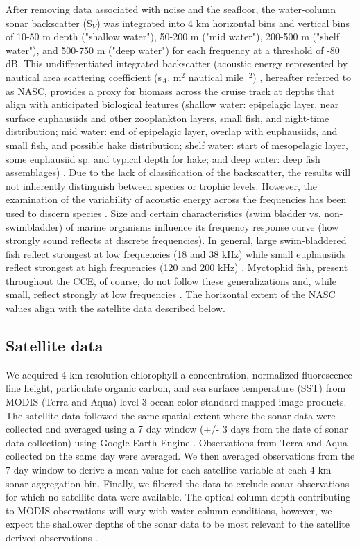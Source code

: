 \documentclass[10pt,letterpaper]{article}
\begin{document}
After removing data associated with noise and the seafloor, the water-column sonar backscatter (S$_{V}$) was integrated into 4 km horizontal bins and vertical bins of 10-50 m depth ("shallow water"), 50-200 m ("mid water"), 200-500 m ("shelf water"), and 500-750 m ("deep water") for each frequency at a threshold of -80 dB.
This undifferentiated integrated backscatter (acoustic energy represented by nautical area scattering coefficient (s$_{A}$, m$^{2}$ nautical mile$^{-2}$) \cite{maclennan2002consistent}, hereafter referred to as NASC, provides a proxy for biomass across the cruise track at depths that align with anticipated biological features (shallow water: epipelagic layer, near surface euphausiids and other zooplankton layers, small fish, and night-time distribution; mid water: end of epipelagic layer, overlap with euphausiids, and small fish, and possible hake distribution; shelf water: start of mesopelagic layer, some euphausiid sp. and typical depth for hake; and deep water: deep fish assemblages) \cite{whitehead1985clupeoid, benoit2004diel, ressler2005spatial, ressler2007pacific}.
Due to the lack of classification of the backscatter, the results will not inherently distinguish between species or trophic levels.
However, the examination of the variability of acoustic energy across the frequencies has been used to discern species \cite{de2010development, korneliussen2002operational}.
Size and certain characteristics (swim bladder vs. non-swimbladder) of marine organisms influence its frequency response curve (how strongly sound reflects at discrete frequencies).
In general, large swim-bladdered fish reflect strongest at low frequencies (18 and 38 kHz) while small euphausiids reflect strongest at high frequencies (120 and 200 kHz) \cite{trenkel2013fisheries}.
Myctophid fish, present throughout the CCE, of course, do not follow these generalizations and, while small, reflect strongly at low frequencies \cite{benoit2009effects}. The horizontal extent of the NASC values align with the satellite data described below.

\subsection*{Satellite data}

We acquired 4 km resolution chlorophyll-a concentration, normalized fluorescence line height, particulate organic carbon, and sea surface temperature (SST) from MODIS (Terra and Aqua) level-3 ocean color standard mapped image products.
The satellite data followed the same spatial extent where the sonar data were collected and averaged using a 7 day window (+/- 3 days from the date of sonar data collection) using Google Earth Engine \cite{nasa2014moderate}.
Observations from Terra and Aqua collected on the same day were averaged.
We then averaged observations from the 7 day window to derive a mean value for each satellite variable at each 4 km sonar aggregation bin.
Finally, we filtered the data to exclude sonar observations for which no satellite data were available.
The optical column depth contributing to MODIS observations will vary with water column conditions, however, we expect the shallower depths of the sonar data to be most relevant to the satellite derived observations \cite{lee2007euphotic}.
\end{document}
